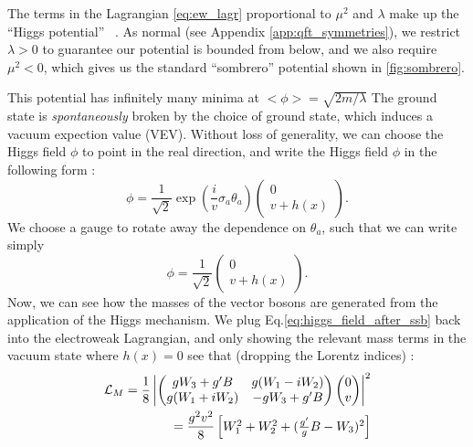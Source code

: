 The terms in the Lagrangian \ref{eq:ew_lagr} proportional to $\mu^2$ and $\lambda$ make up the ``Higgs potential'' ~\cite{Higgs:1964pj}.
As normal (see Appendix \ref{app:qft_symmetries}), we restrict $\lambda > 0$ to guarantee our potential is bounded from below, and we also require $\mu^2 < 0$, which gives us the standard ``sombrero'' potential shown in \ref{fig:sombrero}.

This potential has infinitely many minima at $<\phi> = \sqrt{2m/\lambda}$
The ground state is \textit{spontaneously} broken by the choice of ground state, which induces a vacuum expection value (VEV).
Without loss of generality, we can choose the Higgs field $\phi$ to point in the real direction, and write the Higgs field $\phi$ in the following form :
\begin{equation}
\phi = \frac{1}{\sqrt{2}} \exp( \frac{i}{v} \sigma_a \theta_a ) \begin{pmatrix} 0 \\ v + h(x) \end{pmatrix}.
\end{equation}
We choose a gauge to rotate away the dependence on $\theta_a$, such that we can write simply
\begin{equation}
\label{eq:higgs_field_after_ssb}
\phi = \frac{1}{\sqrt{2}} \begin{pmatrix} 0 \\ v + h(x) \end{pmatrix}.
\end{equation}
Now, we can see how the masses of the vector bosons are generated from the application of the Higgs mechanism.
We plug Eq.\ref{eq:higgs_field_after_ssb} back into the electroweak Lagrangian, and only showing the relevant mass terms in the vacuum state where $h(x) = 0$  see that (dropping the Lorentz indices) :
\begin{align}
\mathcal{L}_M = \frac{1}{8} \begin{vmatrix} \begin{pmatrix} gW_3 + g'B & g(W_1 - iW_2)\\ g(W_1 + iW_2) & -gW_3 + g'B \end{pmatrix}  \begin{pmatrix} 0  \\ v \end{pmatrix} \end{vmatrix}^2\\ = \frac{g^2 v^2}{8} \begin{bmatrix} W_1^2 + W_2^2 + (\frac{g'}{g}B - W_3)^2 \end{bmatrix} \notag
\end{align}
